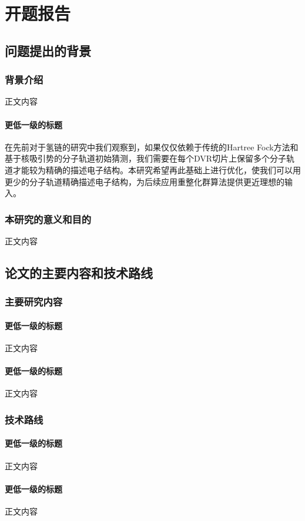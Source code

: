 \documentclass[type=proposal]{wuthesis}
\begin{document}
\chapter{开题报告}
  \begin{refsection}

  \section{问题提出的背景}
  \subsection{背景介绍}
  正文内容
  \subsubsection{更低一级的标题}
  在先前对于氢链的研究中我们观察到，如果仅仅依赖于传统的Hartree Fock方法和基于核吸引势的分子轨道初始猜测，我们需要在每个DVR切片上保留多个分子轨道才能较为精确的描述电子结构\cite{doi:10.1021/acs.jctc.5c00029}。本研究希望再此基础上进行优化，使我们可以用更少的分子轨道精确描述电子结构，为后续应用重整化群算法提供更近理想的输入。
  \subsection{本研究的意义和目的}
  正文内容
  \section{论文的主要内容和技术路线}
  \subsection{主要研究内容}
  \subsubsection{更低一级的标题}
  正文内容
  \subsubsection{更低一级的标题}
  正文内容
  \subsection{技术路线}
  \subsubsection{更低一级的标题}
  正文内容
  \subsubsection{更低一级的标题}
  正文内容

\end{refsection}
\end{document}
